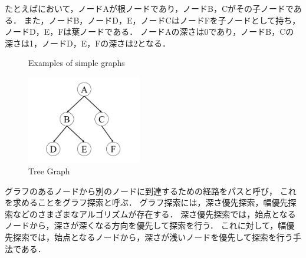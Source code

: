 たとえばにおいて，ノードAが根ノードであり，ノードB，Cがその子ノードである．
また，ノードB，ノードD，E，ノードCはノードFを子ノードとして持ち，ノードD，E，Fは葉ノードである．
ノードAの深さは0であり，ノードB，Cの深さは1，ノードD，E，Fの深さは2となる．

\begin{figure}[h]
  \hspace{0.02\columnwidth}
  \caption{Examples of simple graphs}
  \label{fig:example_simple_graphs}  %
\end{figure}

\begin{figure}[h]
  \begin{center}
    \includegraphics[width=50mm, clip]{figure/chapter2/tree_graph.png}
    \caption{Tree Graph}
    \label{fig:tree_graph} %
  \end{center}
\end{figure}

グラフのあるノードから別のノードに到達するための経路をパスと呼び，
これを求めることをグラフ探索と呼ぶ．
グラフ探索には，深さ優先探索，幅優先探索などのさまざまなアルゴリズムが存在する．
深さ優先探索では，始点となるノードから，深さが深くなる方向を優先して探索を行う．
これに対して，幅優先探索では，始点となるノードから，深さが浅いノードを優先して探索を行う手法である．

